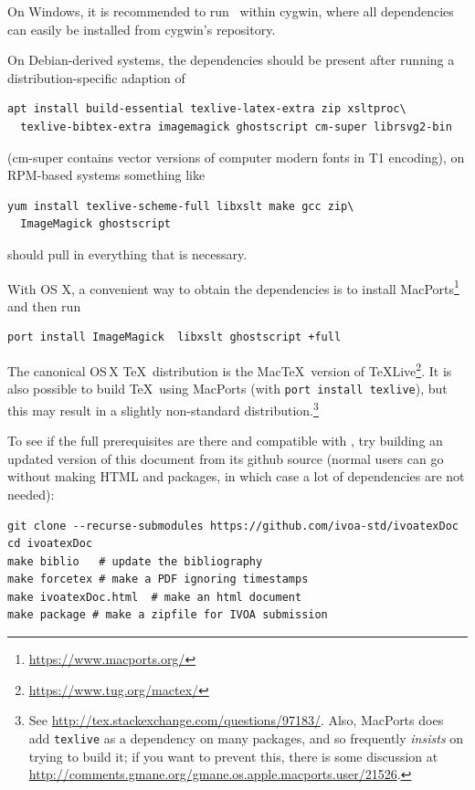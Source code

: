 \documentclass[11pt,a4paper]{ivoa}
\begin{document}
On Windows, it is recommended to run \ivoatex\ within cygwin, where all
dependencies can easily be installed from cygwin's repository.  

On
Debian-derived systems, the dependencies should be present after
running a distribution-specific adaption of
\begin{lstlisting}[basicstyle=\footnotesize]
apt install build-essential texlive-latex-extra zip xsltproc\
  texlive-bibtex-extra imagemagick ghostscript cm-super librsvg2-bin
\end{lstlisting}
(cm-super contains vector versions of computer modern fonts in T1
encoding), on RPM-based systems something like
\begin{lstlisting}
yum install texlive-scheme-full libxslt make gcc zip\
  ImageMagick ghostscript
\end{lstlisting}
should pull in everything that is necessary.

With OS X, a convenient way to obtain the dependencies is to install
MacPorts\footnote{\url{https://www.macports.org/}} and then run
\begin{lstlisting}
port install ImageMagick  libxslt ghostscript +full
\end{lstlisting}
The canonical OS\,X \TeX\ distribution is the Mac\TeX\ version of
\TeX Live\footnote{\url{https://www.tug.org/mactex/}}.  It is also
possible to build \TeX\ using MacPorts (with \texttt{port install
  texlive}), but this may result in a slightly non-standard
distribution.\footnote{See
  \url{http://tex.stackexchange.com/questions/97183/}.
  Also, MacPorts does add
  \texttt{texlive} as a dependency on many packages, and so frequently
  \emph{insists} on trying to build it; if you want to prevent this,
  there is some discussion at
  \url{http://comments.gmane.org/gmane.os.apple.macports.user/21526}.}

To see if the full prerequisites are there and compatible with \ivoatex, try
building an updated version of this document from its github source
(normal users can go without making HTML and packages, in which case a
lot of dependencies are not needed):
\begin{lstlisting}[basicstyle=\footnotesize]
git clone --recurse-submodules https://github.com/ivoa-std/ivoatexDoc
cd ivoatexDoc
make biblio   # update the bibliography
make forcetex # make a PDF ignoring timestamps
make ivoatexDoc.html  # make an html document
make package # make a zipfile for IVOA submission
\end{lstlisting}
\end{document}
